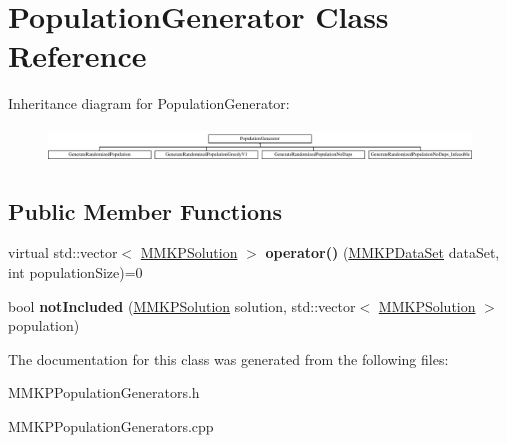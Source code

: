 \hypertarget{class_population_generator}{\section{Population\+Generator Class Reference}
\label{class_population_generator}
}
Inheritance diagram for Population\+Generator\+:\begin{figure}[H]
\begin{center}
\leavevmode
\includegraphics[height=0.918033cm]{class_population_generator}
\end{center}
\end{figure}
\subsection*{Public Member Functions}
\begin{DoxyCompactItemize}
\item 
\hypertarget{class_population_generator_a640e926b542c704b1f0ce1da143c81d8}{virtual std\+::vector$<$ \hyperlink{class_m_m_k_p_solution}{M\+M\+K\+P\+Solution} $>$ {\bfseries operator()} (\hyperlink{class_m_m_k_p_data_set}{M\+M\+K\+P\+Data\+Set} data\+Set, int population\+Size)=0}\label{class_population_generator_a640e926b542c704b1f0ce1da143c81d8}

\item 
\hypertarget{class_population_generator_a06498ef715cfb92f261e8f39a2c7da92}{bool {\bfseries not\+Included} (\hyperlink{class_m_m_k_p_solution}{M\+M\+K\+P\+Solution} solution, std\+::vector$<$ \hyperlink{class_m_m_k_p_solution}{M\+M\+K\+P\+Solution} $>$ population)}\label{class_population_generator_a06498ef715cfb92f261e8f39a2c7da92}

\end{DoxyCompactItemize}


The documentation for this class was generated from the following files\+:\begin{DoxyCompactItemize}
\item 
M\+M\+K\+P\+Population\+Generators.\+h\item 
M\+M\+K\+P\+Population\+Generators.\+cpp\end{DoxyCompactItemize}
